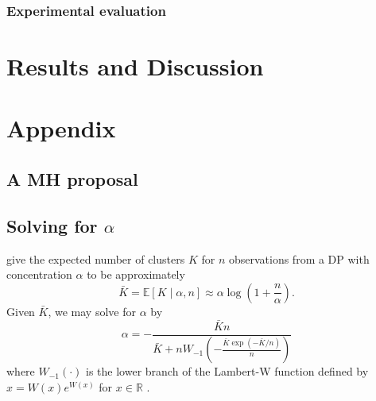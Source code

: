 \documentclass{uwstat572}
\begin{document}
\subsubsection{Experimental evaluation}


\section{Results and Discussion}





\section{Appendix}

\subsection{A MH proposal} \label{sec:mh-proposal}



\subsection{Solving for $\alpha$}

\citet{HA07} give the expected number of clusters $K$ for $n$ observations from a DP with concentration $\alpha$ to be approximately
\begin{equation}
\bar{K} = \mathbb{E}\left[K \mid \alpha, n\right] \approx \alpha \log{\left(1 + \frac{n}{\alpha}\right)}.
\end{equation}
Given $\bar{K}$, we may solve for $\alpha$ by
\begin{equation}
\alpha = - \frac{\bar{K} n}{\bar{K} + n W_{-1}\left(-\frac{\bar{K}\exp\left(-\bar{K}/n\right)}{n}\right)}
\end{equation}
where $W_{-1}\left(\cdot\right)$ is the lower branch of the Lambert-W function defined by $x = W\left(x\right)e^{W\left(x\right)}$ for $x \in \mathbb{R}$ \citep{Cor+96}.
\end{document}
